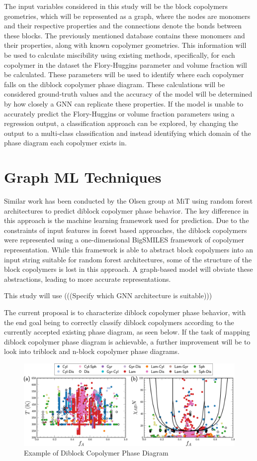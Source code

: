 \documentclass{article}
\begin{document}
The input variables considered in this study will be the block copolymers geometries, which will be represented as a graph, where the nodes are monomers and their respective properties and the connections denote the bonds between these blocks. The previously mentioned database contains these monomers and their properties, along with known copolymer geometries. This information will be used to calculate miscibility using existing methods, specifically, for each copolymer in the dataset the Flory-Huggins parameter and volume fraction will be calculated. These parameters will be used to identify where each copolymer falls on the diblock copolymer phase diagram. These calculations will be considered ground-truth values and the accuracy of the model will be determined by how closely a GNN can replicate these properties. If the model is unable to accurately predict the Flory-Huggins or volume fraction parameters using a regression output, a classification approach can be explored, by changing the output to a multi-class classification and instead identifying which domain of the phase diagram each copolymer exists in.

\section{Graph ML Techniques}

Similar work has been conducted by the Olsen group at MiT\cite{RandForest} using random forest architectures to predict diblock copolymer phase behavior. The key difference in this approach is the machine learning framework used for prediction. Due to the constraints of input features in forest based approaches, the diblock copolymers were represented using a one-dimensional BigSMILES\cite{BigSMILES} framework of copolymer representation. While this framework is able to abstract block copolymers into an input string suitable for random forest architectures, some of the structure of the block copolymers is lost in this approach. A graph-based model will obviate these abstractions, leading to more accurate representations.

This study will use (((Specify which GNN architecture is suitable)))

The current proposal is to characterize diblock copolymer phase behavior, with the end goal being to correctly classify diblock copolymers according to the currently accepted existing phase diagram, as seen below. If the task of mapping diblock copolymer phase diagram is achievable, a further improvement will be to look into triblock and n-block copolymer phase diagrams.

\begin{figure}[h]
\caption{Example of Diblock Copolymer Phase Diagram\cite{RandForest}}
\centering
\includegraphics[width=\textwidth]{template/images_large_mz1c00521_0001.jpeg}
\end{figure}




\end{document}
